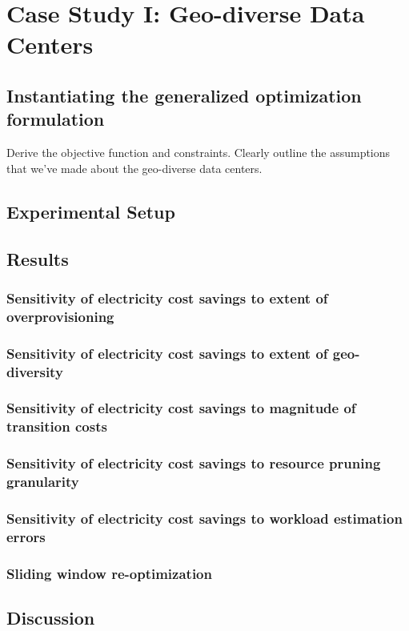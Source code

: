 \chapter{Case Study I: Geo-diverse Data Centers}

\section{Instantiating the generalized optimization formulation} Derive the objective function and constraints. Clearly outline the assumptions that we've made about the geo-diverse data centers.

\section{Experimental Setup} 

\section{Results}
\subsection{Sensitivity of electricity cost savings to extent of overprovisioning}
\subsection{Sensitivity of electricity cost savings to extent of geo-diversity}
\subsection{Sensitivity of electricity cost savings to magnitude of transition costs}
\subsection{Sensitivity of electricity cost savings to resource pruning granularity}
\subsection{Sensitivity of electricity cost savings to workload estimation errors}
\subsection{Sliding window re-optimization}

\section{Discussion}